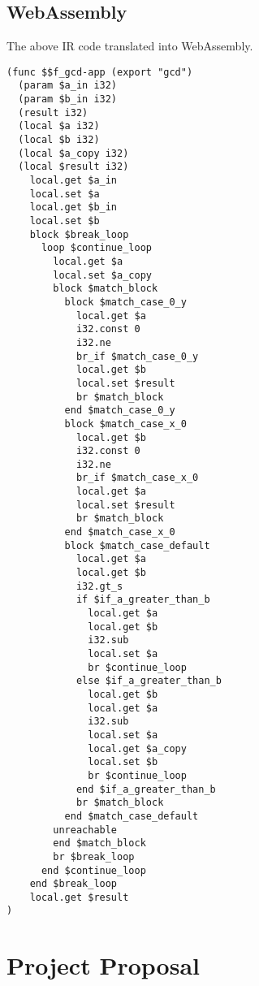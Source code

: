 \documentclass[12pt,twoside,notitlepage]{report}
\begin{document}
\section{WebAssembly}
The above IR code translated into WebAssembly.

\begin{verbatim}
(func $$f_gcd-app (export "gcd")
  (param $a_in i32)
  (param $b_in i32)
  (result i32)
  (local $a i32)
  (local $b i32)
  (local $a_copy i32)
  (local $result i32)
    local.get $a_in
    local.set $a
    local.get $b_in
    local.set $b
    block $break_loop
      loop $continue_loop
        local.get $a
        local.set $a_copy
        block $match_block
          block $match_case_0_y
            local.get $a
            i32.const 0
            i32.ne
            br_if $match_case_0_y
            local.get $b
            local.set $result
            br $match_block
          end $match_case_0_y
          block $match_case_x_0
            local.get $b
            i32.const 0
            i32.ne
            br_if $match_case_x_0
            local.get $a
            local.set $result
            br $match_block
          end $match_case_x_0
          block $match_case_default
            local.get $a
            local.get $b
            i32.gt_s
            if $if_a_greater_than_b
              local.get $a
              local.get $b
              i32.sub
              local.set $a
              br $continue_loop
            else $if_a_greater_than_b
              local.get $b
              local.get $a
              i32.sub
              local.set $a
              local.get $a_copy
              local.set $b
              br $continue_loop
            end $if_a_greater_than_b
            br $match_block
          end $match_case_default
        unreachable
        end $match_block
        br $break_loop
      end $continue_loop
    end $break_loop
    local.get $result
)
\end{verbatim}

\clearpage

\chapter{Project Proposal}
\clearpage


\end{document}
